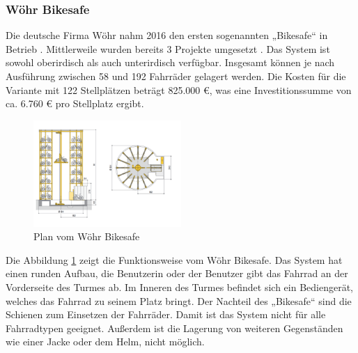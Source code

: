 \subsubsection{Wöhr Bikesafe}
Die deutsche Firma Wöhr nahm 2016 den ersten sogenannten „Bikesafe“ in Betrieb . Mittlerweile wurden bereits 3 Projekte umgesetzt . Das System ist sowohl oberirdisch als auch unterirdisch verfügbar. Insgesamt können je nach Ausführung zwischen 58 und 192 Fahrräder gelagert werden. Die Kosten für die Variante mit 122 Stellplätzen beträgt 825.000 \euro{}, was eine Investitionssumme von ca. 6.760 \euro{} pro Stellplatz ergibt. 

\begin{figure}[H]
    \centering
    \includegraphics[width=0.5\textwidth]{images/bikesafe.png}
    \caption{Plan vom Wöhr Bikesafe }
    \label{fig:bikesafe}
\end{figure}

\noindent Die Abbildung \ref{fig:bikesafe} zeigt die Funktionsweise vom Wöhr Bikesafe. Das System hat einen runden Aufbau, die Benutzerin oder der Benutzer gibt das Fahrrad an der Vorderseite des Turmes ab. Im Inneren des Turmes befindet sich ein Bediengerät, welches das Fahrrad zu seinem Platz bringt.
\noindent Der Nachteil des „Bikesafe“ sind die Schienen zum Einsetzen der Fahrräder. Damit ist das System nicht für alle Fahrradtypen geeignet. Außerdem ist die Lagerung von weiteren Gegenständen wie einer Jacke oder dem Helm, nicht möglich.
